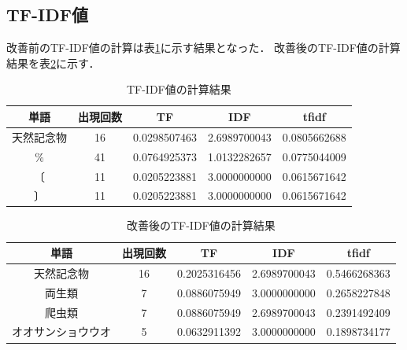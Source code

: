 \documentclass[a4paper,11pt]{ltjsarticle}
\begin{document}
\subsection{TF-IDF値}
改善前のTF-IDF値の計算は表\ref{tab:TFIDF-result}に示す結果となった．
改善後のTF-IDF値の計算結果を表\ref{tab:TFIDF-result2}に示す．
\begin{table}[htbp]
    \centering
    \caption{TF-IDF値の計算結果}
    \label{tab:TFIDF-result}
    \begin{tabular}{|c|c|c|c|c|}
        \hline
        単語    & 出現回数 & TF           & IDF          & tfidf        \\
        \hline
        天然記念物 & 16   & 0.0298507463 & 2.6989700043 & 0.0805662688 \\
        \hline
        \%    & 41   & 0.0764925373 & 1.0132282657 & 0.0775044009 \\
        \hline
        〔     & 11   & 0.0205223881 & 3.0000000000 & 0.0615671642 \\
        \hline
        〕     & 11   & 0.0205223881 & 3.0000000000 & 0.0615671642 \\
        \hline
    \end{tabular}
\end{table}
\begin{table}[htbp]
    \centering
    \caption{改善後のTF-IDF値の計算結果}
    \label{tab:TFIDF-result2}
    \begin{tabular}{|c|c|c|c|c|}
        \hline
        単語        & 出現回数 & TF           & IDF          & tfidf        \\
        \hline
        天然記念物     & 16   & 0.2025316456 & 2.6989700043 & 0.5466268363 \\
        \hline
        両生類       & 7    & 0.0886075949 & 3.0000000000 & 0.2658227848 \\
        \hline
        爬虫類       & 7    & 0.0886075949 & 2.6989700043 & 0.2391492409 \\
        \hline
        オオサンショウウオ & 5    & 0.0632911392 & 3.0000000000 & 0.1898734177 \\
        \hline
    \end{tabular}
\end{table}
\end{document}

